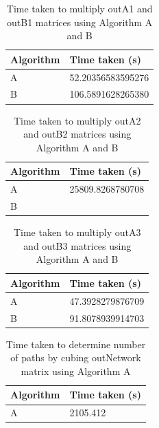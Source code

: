 \documentclass[10pt,twocolumn]{witseiepaper}
\begin{document}
\begin{table}[h]
		\centering
		\caption{Time taken to multiply outA1 and outB1 matrices using Algorithm A and B}
\begin{tabular}{|l|l|}
	\hline 
	\textbf{Algorithm} & \textbf{Time taken (s)} \\ 
	\hline 
	 A & 52.20356583595276 \\ 
	\hline 
	 B & 106.5891628265380 \\ 
	\hline 
\end{tabular} 
\end{table}

\begin{table}[h]
	\centering
	\caption{Time taken to multiply outA2 and outB2 matrices using Algorithm A and B}
	\begin{tabular}{|l|l|}
		\hline 
		\textbf{Algorithm} & \textbf{Time taken (s)} \\ 
		\hline 
		A & 25809.8268780708 \\ 
		\hline 
		B &  \\ 
		\hline 
	\end{tabular} 
\end{table}

\begin{table}[h]
	\centering
	\caption{Time taken to multiply outA3 and outB3 matrices using Algorithm A and B}
	\begin{tabular}{|l|l|}
		\hline 
		\textbf{Algorithm} & \textbf{Time taken (s)} \\ 
		\hline 
		A & 47.3928279876709 \\ 
		\hline 
		B & 91.8078939914703 \\ 
		\hline 
	\end{tabular} 
\end{table}

\begin{table}[h]
	\centering
	\caption{Time taken to determine number of paths by cubing outNetwork matrix using Algorithm A}
	\begin{tabular}{|l|l|}
		\hline 
		\textbf{Algorithm} & \textbf{Time taken (s)} \\ 
		\hline 
		A & 2105.412 \\ 
		\hline 
	\end{tabular} 
\end{table}




\end{document}
